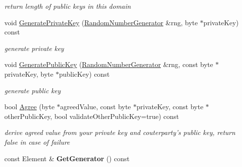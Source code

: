 \begin{DoxyCompactItemize}
\begin{DoxyCompactList}\small\item\em return length of public keys in this domain \item\end{DoxyCompactList}\item 
void \hyperlink{class_d_l___simple_key_agreement_domain_base_ad3208753e84fde55582823abdd9922a5}{GeneratePrivateKey} (\hyperlink{class_random_number_generator}{RandomNumberGenerator} \&rng, byte $\ast$privateKey) const 
\begin{DoxyCompactList}\small\item\em generate private key \item\end{DoxyCompactList}\item 
void \hyperlink{class_d_l___simple_key_agreement_domain_base_a3e1caeee8c363962a1c766e53f95ef95}{GeneratePublicKey} (\hyperlink{class_random_number_generator}{RandomNumberGenerator} \&rng, const byte $\ast$privateKey, byte $\ast$publicKey) const 
\begin{DoxyCompactList}\small\item\em generate public key \item\end{DoxyCompactList}\item 
bool \hyperlink{class_d_l___simple_key_agreement_domain_base_aa27177cea8a872273736e593d1327157}{Agree} (byte $\ast$agreedValue, const byte $\ast$privateKey, const byte $\ast$otherPublicKey, bool validateOtherPublicKey=true) const 
\begin{DoxyCompactList}\small\item\em derive agreed value from your private key and couterparty's public key, return false in case of failure \item\end{DoxyCompactList}\item 
\hypertarget{class_d_l___simple_key_agreement_domain_base_ac6e9d2d75aee441f06b7522c1a6ea37c}{
const Element \& {\bfseries GetGenerator} () const }
\label{class_d_l___simple_key_agreement_domain_base_ac6e9d2d75aee441f06b7522c1a6ea37c}

\end{DoxyCompactItemize}
